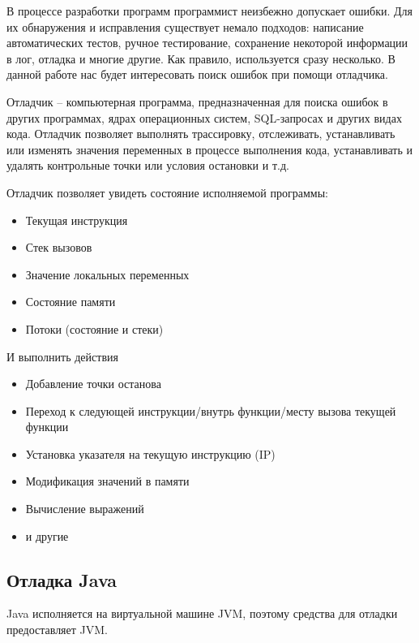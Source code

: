 В процессе разработки программ программист неизбежно допускает ошибки. Для их обнаружения и исправления существует немало подходов: написание автоматических тестов, ручное тестирование, сохранение некоторой информации в лог, отладка и многие другие. Как правило, используется сразу несколько. В данной работе нас будет интересовать поиск ошибок при помощи отладчика.

\begin{definition}\label{debugger:definition}
	Отладчик --  компьютерная программа, предназначенная для поиска ошибок в других программах, ядрах операционных систем, SQL-запросах и других видах кода. Отладчик позволяет выполнять трассировку, отслеживать, устанавливать или изменять значения переменных в процессе выполнения кода, устанавливать и удалять контрольные точки или условия остановки и т.д.\cite{wiki:debugger}
\end{definition}

\noindent Отладчик позволяет увидеть состояние исполняемой программы:

\begin{itemize}
	\item Текущая инструкция
	\item Стек вызовов
	\item Значение локальных переменных
	\item Состояние памяти
	\item Потоки (состояние и стеки)
\end{itemize}

\noindent И выполнить действия

\begin{itemize}
	\item Добавление точки останова
	\item Переход к следующей инструкции/внутрь функции/месту вызова текущей функции
	\item Установка указателя на текущую инструкцию (IP)
	\item Модификация значений в памяти
	\item Вычисление выражений
	\item и другие
\end{itemize}

\subsection{Отладка Java}

Java исполняется на виртуальной машине JVM, поэтому средства для отладки предоставляет 
JVM.


